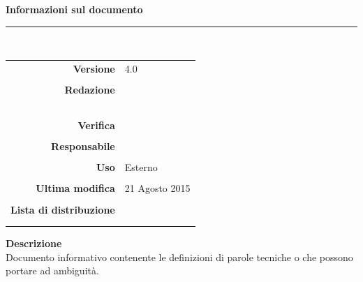 \begin{titlepage}
\begin{center}
	\vspace{1cm}
	\textbf{Informazioni sul documento}\\
    \rule{10cm}{.4pt} \\
	\begin{table}[h]
	\begin{center}
	\begin{tabular}{r | l}
		\textbf{Versione} & 4.0 \\ \\
		\textbf{Redazione} & \ReAn \\
			& \GoIs \\
			& \MaMo \\
			& \CoMa \\
			& \VeFe \\ \\
		\textbf{Verifica} &\CoMa \\ \\
		\textbf{Responsabile} & \CaMa \\ \\
		\textbf{Uso} & Esterno \\ \\
		\textbf{Ultima modifica} & 21 Agosto 2015 \\ \\
		\textbf{Lista di distribuzione} & \Vardanega \\ 
		    & \Cardin \\
		    & \Zucchetti
	\end{tabular}
	\end{center}
	\end{table}
			\textbf{Descrizione} \\
			Documento informativo contenente le definizioni di parole tecniche o che possono portare ad ambiguità. 
	\end{center}
\end{titlepage}